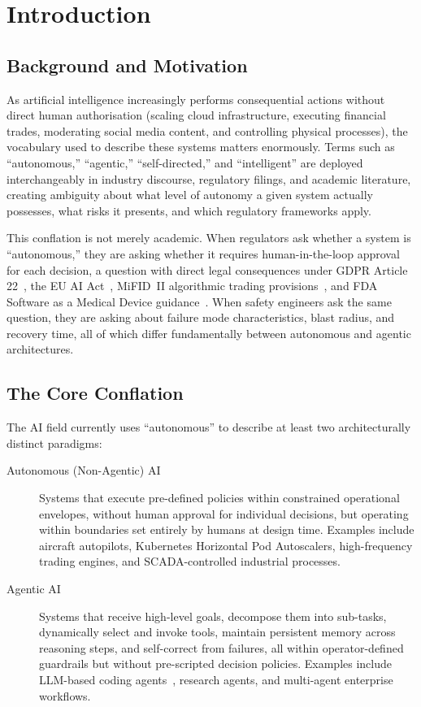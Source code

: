 \documentclass[12pt, a4paper]{article}
\begin{document}
\newpage

\section{Introduction}\label{sec:intro}

\subsection{Background and Motivation}
As artificial intelligence increasingly performs consequential actions without direct human authorisation (scaling cloud infrastructure, executing financial trades, moderating social media content, and controlling physical processes), the vocabulary used to describe these systems matters enormously. Terms such as ``autonomous,'' ``agentic,'' ``self-directed,'' and ``intelligent'' are deployed interchangeably in industry discourse, regulatory filings, and academic literature, creating ambiguity about what level of autonomy a given system actually possesses, what risks it presents, and which regulatory frameworks apply.

This conflation is not merely academic. When regulators ask whether a system is ``autonomous,'' they are asking whether it requires human-in-the-loop approval for each decision, a question with direct legal consequences under GDPR Article 22~\citep{eu2016gdpr}, the EU AI Act~\citep{eu2024aiact}, MiFID~II algorithmic trading provisions~\citep{mifid2014}, and FDA Software as a Medical Device guidance~\citep{fda2019samd}. When safety engineers ask the same question, they are asking about failure mode characteristics, blast radius, and recovery time, all of which differ fundamentally between autonomous and agentic architectures.

\subsection{The Core Conflation}
The AI field currently uses ``autonomous'' to describe at least two architecturally distinct paradigms:

\begin{description}
    \item[Autonomous (Non-Agentic) AI] Systems that execute pre-defined policies within constrained operational envelopes, without human approval for individual decisions, but operating within boundaries set entirely by humans at design time. Examples include aircraft autopilots, Kubernetes Horizontal Pod Autoscalers, high-frequency trading engines, and SCADA-controlled industrial processes.
    \item[Agentic AI] Systems that receive high-level goals, decompose them into sub-tasks, dynamically select and invoke tools, maintain persistent memory across reasoning steps, and self-correct from failures, all within operator-defined guardrails but without pre-scripted decision policies. Examples include LLM-based coding agents~\citep{mahdi2026agentic}, research agents, and multi-agent enterprise workflows.
\end{description}
\end{document}
